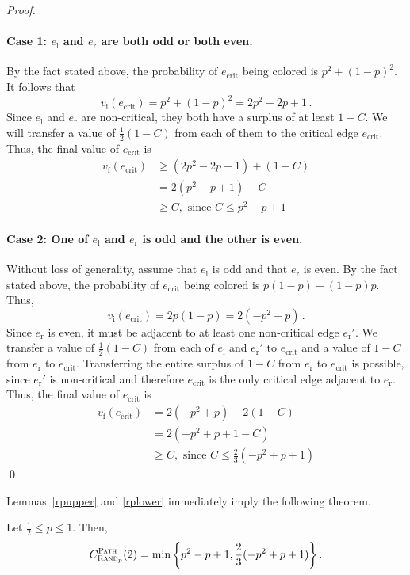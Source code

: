 \documentclass[smallextended]{svjour3}
\def\paths{\text{\sc Path}\xspace}
\newcommand{\ivalue}{\ensuremath{v_{\text{i}}}\xspace}
\newcommand{\fvalue}{\ensuremath{v_{\text{f}}}\xspace}
\newcommand{\ecrit}{\ensuremath{e_{\text{crit}}}\xspace}
\newcommand{\RP}{\ensuremath{\operatorname{\textsc{Rand}}}\xspace}
\begin{document}
\begin{proof}
\paragraph{Case 1: $e_{\text{l}}$ and $e_{\text{r}}$ are both odd or both even.} By the fact stated above, the probability of $\ecrit$ being colored is $p^2+(1-p)^2$. It follows that 
 $$\ivalue(\ecrit)=p^2+(1-p)^2 = 2p^2-2p+1\,.$$ 
Since $e_{\text{l}}$ and $e_{\text{r}}$ are non-critical, they both have a surplus of at least $1-C$. We will transfer a value of $\frac{1}{2}(1-C)$ from each of them to the critical edge $\ecrit$. Thus, the final value of $\ecrit$ is 
\begin{align*}
\fvalue(\ecrit) 
& \geq (2p^2-2p+1)+(1-C) \\
& =2(p^2-p+1)-C\\
& \geq C, \text{ since } C \leq p^2-p+1
\end{align*}


\paragraph{Case 2: One of $e_{\text{l}}$ and $e_{\text{r}}$ is odd and the other is even.} Without loss of generality, assume that $e_{\text{l}}$ is odd and that $e_{\text{r}}$ is even. By the fact stated above, the probability of $\ecrit$ being colored is $p(1-p)+(1-p)p$.
Thus,
 $$\ivalue(\ecrit) = 2p(1-p) = 2(-p^2+p)\,.$$
 Since $e_{\text{r}}$ is even, it must be adjacent to at least one non-critical edge $e_{\text{r}}'$. We transfer a value of $\frac{1}{2}(1-C)$ from each of $e_{\text{l}}$ and $e_{\text{r}}'$ to $\ecrit$ and a value of $1-C$ from $e_{\text{r}}$ to $\ecrit$. Transferring the entire surplus of $1-C$ from $e_{\text{r}}$ to $\ecrit$ is possible, since $e_{\text{r}}'$ is non-critical and therefore $\ecrit$ is the only critical edge adjacent to $e_{\text{r}}$. 
Thus, the final value of $\ecrit$ is 
\begin{align*}
\fvalue(\ecrit)
& = 2(-p^2+p) + 2(1-C)\\
& = 2(-p^2+p+1-C) \\
& \geq C, \text{ since } C \leq \frac{2}{3}(-p^2+p+1)
\end{align*}
\qed\end{proof}

Lemmas~\ref{rpupper} and \ref{rplower} immediately imply the following theorem.

\begin{theorem}
\label{rp}
Let $\frac12 \leq p\leq 1$. Then,
\begin{displaymath}
  C_{\RP_p}^{\text{\paths}}(2)=\min\left\{p^2-p+1, \frac{2}{3}(-p^2+p+1)\right\}.
\end{displaymath}
\end{theorem}
\end{document}
